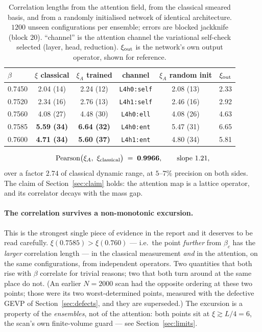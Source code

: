 \documentclass[11pt,a4paper]{article}
\newcommand{\xiA}{\xi_A}
\begin{document}
\begin{table}[htbp]
\centering
\caption{Correlation lengths from the attention field, from the classical
smeared basis, and from a randomly initialised network of identical
architecture. $1200$ unseen configurations per ensemble; errors are blocked
jackknife (block $20$). ``channel'' is the attention channel the variational
self-check selected (layer, head, reduction). $\xi_{\rm out}$ is the network's
own output operator, shown for reference.}
\label{tab:headline}
\begin{tabular}{@{}lccccc@{}}
\toprule
$\beta$ & $\xi$ classical & $\xiA$ \textbf{trained} & channel
        & $\xiA$ random init & $\xi_{\rm out}$ \\
\midrule
0.7450 & 2.04 (14) & 2.24 (12) & \texttt{L4h0:self} & 2.08 (13) & 2.33 \\
0.7520 & 2.34 (16) & 2.76 (13) & \texttt{L4h1:self} & 2.46 (16) & 2.92 \\
0.7560 & 4.08 (27) & 4.48 (30) & \texttt{L4h0:ell}  & 4.08 (26) & 4.63 \\
0.7585 & \textbf{5.59 (34)} & \textbf{6.64 (32)} & \texttt{L4h0:ent} & 5.47 (31) & 6.65 \\
0.7600 & \textbf{4.71 (34)} & \textbf{5.60 (37)} & \texttt{L4h1:ent} & 4.80 (34) & 5.81 \\
\bottomrule
\end{tabular}
\end{table}

\begin{equation}
  \textrm{Pearson}\big(\xiA,\ \xi_{\rm classical}\big) \;=\; \mathbf{0.9966},
  \qquad \textrm{slope } 1.21,
\end{equation}
over a factor $2.74$ of classical dynamic range, at $5$--$7\%$ precision on both
sides. The claim of Section~\ref{sec:claim} holds: the attention map is a
lattice operator, and its correlator decays with the mass gap.

\paragraph{The correlation survives a non-monotonic excursion.} This is the
strongest single piece of evidence in the report and it deserves to be read
carefully. $\xi(0.7585) > \xi(0.760)$ --- i.e.\ the point \emph{further} from
$\beta_c$ has the \emph{larger} correlation length --- in the classical
measurement \emph{and} in the attention, on the same configurations, from
independent operators. Two quantities that both rise with $\beta$ correlate for
trivial reasons; two that both turn around at the same place do not. (An earlier
$N=2000$ scan had the opposite ordering at these two points; those were its two
worst-determined points, measured with the defective GEVP of
Section~\ref{sec:defects}, and they are superseded.) The excursion is a property
of the \emph{ensembles}, not of the attention: both points sit at
$\xi \gtrsim L/4 = 6$, the scan's own finite-volume guard --- see
Section~\ref{sec:limits}.
\end{document}
